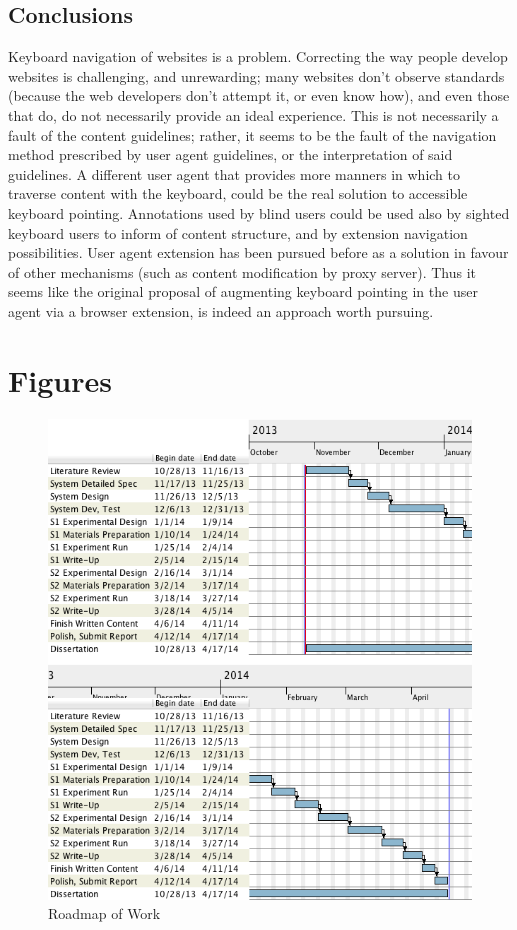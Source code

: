 \documentclass[a4paper, 11pt]{article}
\begin{document}
\subsection{Conclusions}
Keyboard navigation of websites is a problem. Correcting the way people develop websites is challenging, and unrewarding; many websites don't observe standards (because the web developers don't attempt it, or even know how), and even those that do, do not necessarily provide an ideal experience. This is not necessarily a fault of the content guidelines; rather, it seems to be the fault of the navigation method prescribed by user agent guidelines, or the interpretation of said guidelines. A different user agent that provides more manners in which to traverse content with the keyboard, could be the real solution to accessible keyboard pointing. Annotations used by blind users could be used also by sighted keyboard users to inform of content structure, and by extension navigation possibilities. User agent extension has been pursued before as a solution in favour of other mechanisms (such as content modification by proxy server). Thus it seems like the original proposal of augmenting keyboard pointing in the user agent via a browser extension, is indeed an approach worth pursuing.

\pagebreak
\section{Figures}
\begin{figure}[ht]
\centering
\includegraphics[width=\linewidth]{roadmapcrop2}
\caption{Roadmap of Work}
\label{fig:roadmap}
\end{figure}
%
%
\pagebreak
\printglossary[title=Terms]
\end{document}
